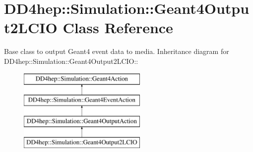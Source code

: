 \hypertarget{class_d_d4hep_1_1_simulation_1_1_geant4_output2_l_c_i_o}{
\section{DD4hep::Simulation::Geant4Output2LCIO Class Reference}
\label{class_d_d4hep_1_1_simulation_1_1_geant4_output2_l_c_i_o}
}


Base class to output Geant4 event data to media.  
Inheritance diagram for DD4hep::Simulation::Geant4Output2LCIO::\begin{figure}[H]
\begin{center}
\leavevmode
\includegraphics[height=4cm]{class_d_d4hep_1_1_simulation_1_1_geant4_output2_l_c_i_o}
\end{center}
\end{figure}
